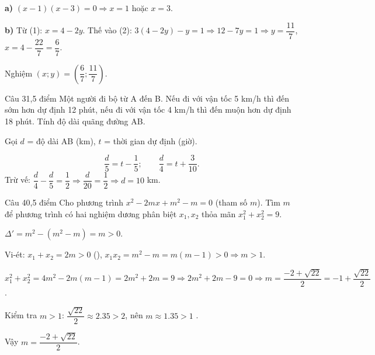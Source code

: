 \begin{loi_giai_cau}
\textbf{a)} $(x-1)(x-3)=0\Rightarrow\boxed{x=1}$ hoặc $\boxed{x=3}$.

\textbf{b)} Từ (1): $x=4-2y$. Thế vào (2): $3(4-2y)-y=1\Rightarrow12-7y=1\Rightarrow y=\dfrac{11}{7}$, $x=4-\dfrac{22}{7}=\dfrac{6}{7}$.

Nghiệm $\boxed{(x;y)=\left(\dfrac{6}{7};\dfrac{11}{7}\right)}$.
\end{loi_giai_cau}

\begin{de_cau}{Câu 3}{1,5 điểm}
Một người đi bộ từ A đến B. Nếu đi với vận tốc 5 km/h thì đến sớm hơn dự định 12 phút, nếu đi với vận tốc 4 km/h thì đến muộn hơn dự định 18 phút. Tính độ dài quãng đường AB.
\end{de_cau}

\begin{loi_giai_cau}
Gọi $d$ = độ dài AB (km), $t$ = thời gian dự định (giờ).

\[\frac{d}{5}=t-\frac{1}{5};\qquad\frac{d}{4}=t+\frac{3}{10}.\]
Trừ vế: $\dfrac{d}{4}-\dfrac{d}{5}=\dfrac{1}{2}\Rightarrow\dfrac{d}{20}=\dfrac{1}{2}\Rightarrow d=\boxed{10}$ km.
\end{loi_giai_cau}

\begin{de_cau}{Câu 4}{0,5 điểm}
Cho phương trình $x^2-2mx+m^2-m=0$ (tham số $m$). Tìm $m$ để phương trình có hai nghiệm dương phân biệt $x_1, x_2$ thỏa mãn $x_1^2+x_2^2=9$.
\end{de_cau}

\begin{loi_giai_cau}
$\Delta'=m^2-(m^2-m)=m>0$.

Vi-ét: $x_1+x_2=2m>0$ (\checkmark ), $x_1x_2=m^2-m=m(m-1)>0\Rightarrow m>1$.

$x_1^2+x_2^2=4m^2-2m(m-1)=2m^2+2m=9\Rightarrow2m^2+2m-9=0\Rightarrow m=\dfrac{-2+\sqrt{22}}{2}=-1+\dfrac{\sqrt{22}}{2}$.

Kiểm tra $m>1$: $\dfrac{\sqrt{22}}{2}\approx2.35>2$, nên $m\approx1.35>1$ \checkmark .

Vậy $\boxed{m=\dfrac{-2+\sqrt{22}}{2}}$.
\end{loi_giai_cau}
